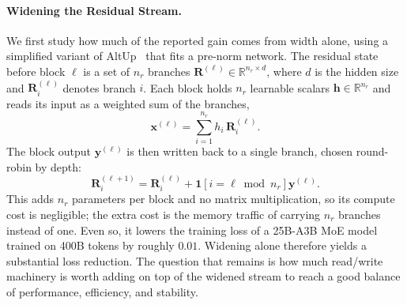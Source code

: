 \paragraph{Widening the Residual Stream.}
\label{sec:residual-width}
We first study how much of the reported gain comes from width alone, using a
simplified variant of AltUp~\citep{baykal2023altup} that fits a pre-norm
network. The residual state before block $\ell$ is a set of $n_r$ branches
$\bm{R}^{(\ell)}\in\mathbb{R}^{n_r\times d}$, where $d$ is the hidden size
and $\bm{R}^{(\ell)}_i$ denotes branch $i$. Each block holds $n_r$ learnable
scalars $\bm{h}\in\mathbb{R}^{n_r}$ and reads its input as a weighted sum of
the branches,
\begin{equation}
\bm{x}^{(\ell)} = \sum_{i=1}^{n_r} h_i\,\bm{R}^{(\ell)}_i .
\label{eq:altup-read}
\end{equation}
The block output $\bm{y}^{(\ell)}$ is then written back to a single branch,
chosen round-robin by depth:
\begin{equation}
\bm{R}^{(\ell+1)}_i =
\bm{R}^{(\ell)}_i + \mathbf{1}\left[i = \ell \bmod n_r\right]\bm{y}^{(\ell)} .
\label{eq:altup-write}
\end{equation}
This adds $n_r$ parameters per block and no matrix multiplication, so its
compute cost is negligible; the extra cost is the memory traffic of carrying
$n_r$ branches instead of one. Even so, it lowers the training loss of a
25B-A3B MoE model trained on 400B tokens by roughly $0.01$. Widening alone
therefore yields a substantial loss reduction. The question that remains is
how much read/write machinery is worth adding on top of the widened stream to
reach a good balance of performance, efficiency, and stability.

